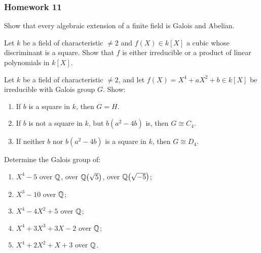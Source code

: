 \subsubsection{Homework 11}
\setcounter{exercise}{0} \setcounter{equation}{0}

\begin{problem}
  Show that every algebraic extension of a finite field is Galois and
  Abelian.
\end{problem}
\begin{solution}
\end{solution}

\begin{problem}
  Let \(k\) be a field of characteristic \(\neq 2\) and \(f(X)\in k[X]\) a
  cubic whose discriminant is a square. Show that \(f\) is either
  irreducible or a product of linear polynomials in \(k[X]\).
\end{problem}
\begin{solution}
\end{solution}

\begin{problem}
  Let \(k\) be a field of characteristic \(\neq 2\), and let
  \(f(X)=X^4+aX^2+b\in k[X]\) be irreducible with Galois group \(G\). Show:
  \begin{enumerate}[label=(\roman*),noitemsep]
  \item If \(b\) is a square in \(k\), then \(G=H\).
  \item If \(b\) is not a square in \(k\), but \(b(a^2-4b)\) is, then
    \(G\cong C_4\).
  \item If neither \(b\) nor \(b(a^2-4b)\) is a square in \(k\), then
    \(G\cong D_4\).
  \end{enumerate}
\end{problem}
\begin{solution}
\end{solution}

\begin{problem}
  Determine the Galois group of:
  \begin{enumerate}[label=(\alph*),noitemsep]
  \item \(X^4-5\) over \(\mathbb{Q}\), over \(\mathbb{Q}\bigl(\sqrt{5}\bigr)\), over
    \(\mathbb{Q}\bigl(\sqrt{-5}\bigr)\);
  \item \(X^3-10\) over \(\mathbb{Q}\);
  \item \(X^4-4X^2+5\) over \(\mathbb{Q}\);
  \item \(X^4+3X^3+3X-2\) over \(\mathbb{Q}\);
  \item \(X^4+2X^2+X+3\) over \(\mathbb{Q}\).
  \end{enumerate}
\end{problem}
\begin{solution}
\end{solution}

